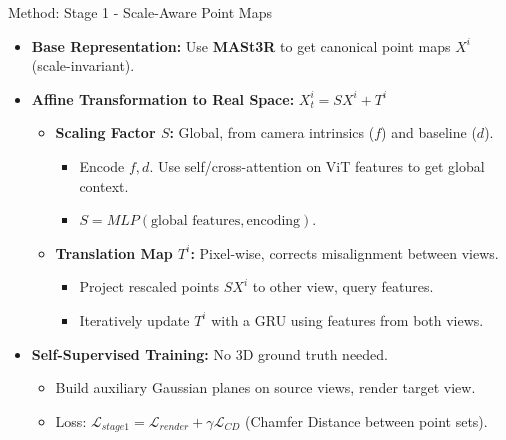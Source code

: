 \begin{frame}{Method: Stage 1 - Scale-Aware Point Maps}
    \begin{itemize}
        \item \textbf{Base Representation:} Use \textbf{MASt3R} to get canonical point maps $X^i$ (scale-invariant).
        \item \textbf{Affine Transformation to Real Space:} $X_t^i = S X^i + T^i$
        \begin{itemize}
            \item \textbf{Scaling Factor $S$:} Global, from camera intrinsics ($f$) and baseline ($d$).
            \begin{itemize}
                \item Encode $f, d$. Use self/cross-attention on ViT features to get global context.
                \item $S = MLP(\text{global features}, \text{encoding})$.
            \end{itemize}
            \item \textbf{Translation Map $T^i$:} Pixel-wise, corrects misalignment between views.
            \begin{itemize}
                \item Project rescaled points $SX^i$ to other view, query features.
                \item Iteratively update $T^i$ with a GRU using features from both views.
            \end{itemize}
        \end{itemize}
        \item \textbf{Self-Supervised Training:} No 3D ground truth needed.
        \begin{itemize}
            \item Build auxiliary Gaussian planes on source views, render target view.
            \item Loss: $\mathcal{L}_{stage1} = \mathcal{L}_{render} + \gamma \mathcal{L}_{CD}$ (Chamfer Distance between point sets).
        \end{itemize}
    \end{itemize}
\end{frame}

